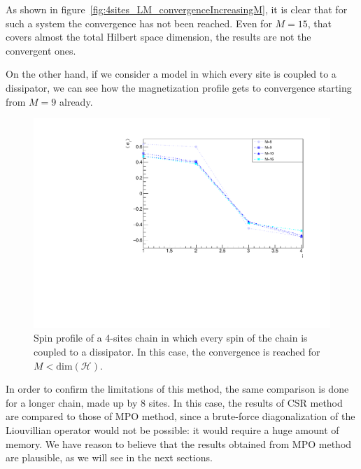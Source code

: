 As shown in figure~\ref{fig:4sites_LM_convergenceIncreasingM}, it is clear that for such a system the convergence has not been reached. Even for $M = 15$, that covers almost the total Hilbert space dimension, the results are not the convergent ones.

On the other hand, if we consider a model in which every site is coupled to a dissipator, we can see how the magnetization profile gets to convergence starting from $M = 9$ already.


\begin{figure}[H]
    \centering
    \includegraphics[scale=0.7]{Figures/4sites/4sites_totalDissipators.pdf}
    \captionsetup{width=1.\linewidth}
    \caption{Spin profile of a 4-sites chain in which every spin of the chain is coupled to a dissipator. In this case, the convergence is reached for $M<\text{dim}(\mathcal{H})$.}
    \label{fig:4sites_totalDissipators}
\end{figure}

In order to confirm the limitations of this method, the same comparison is done for a longer chain, made up by 8 sites. In this case, the results of CSR method are compared to those of MPO method, since a brute-force diagonalization of the Liouvillian operator would not be possible: it would require a huge amount of memory. We have reason to believe that the results obtained from MPO method are plausible, as we will see in the next sections.

